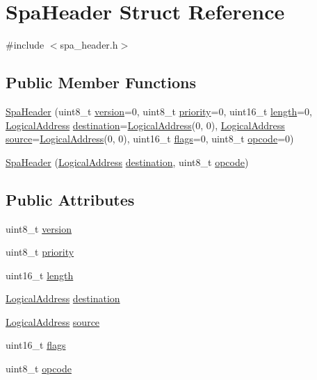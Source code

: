 \hypertarget{structSpaHeader}{}\section{Spa\+Header Struct Reference}
\label{structSpaHeader}


{\ttfamily \#include $<$spa\+\_\+header.\+h$>$}

\subsection*{Public Member Functions}
\begin{DoxyCompactItemize}
\item 
\hyperlink{structSpaHeader_ae285cc7f5785c5d5940ae05a4e93a4f9}{Spa\+Header} (uint8\+\_\+t \hyperlink{structSpaHeader_ad0b9fa178a6b015fdfc312e1bd5fc927}{version}=0, uint8\+\_\+t \hyperlink{structSpaHeader_a3d04bb2382ba9e4a61a05b0f97779d7c}{priority}=0, uint16\+\_\+t \hyperlink{structSpaHeader_a3e5638afb3bf73d772b912d17b68da04}{length}=0, \hyperlink{structLogicalAddress}{Logical\+Address} \hyperlink{structSpaHeader_a0e1de2c2d1f0a5d757ca558801c46ff6}{destination}=\hyperlink{structLogicalAddress}{Logical\+Address}(0, 0), \hyperlink{structLogicalAddress}{Logical\+Address} \hyperlink{structSpaHeader_ad30add6637ff3a67a3043861c7cee511}{source}=\hyperlink{structLogicalAddress}{Logical\+Address}(0, 0), uint16\+\_\+t \hyperlink{structSpaHeader_af39e8bfb4d14dd363f6e86f5a794ae2b}{flags}=0, uint8\+\_\+t \hyperlink{structSpaHeader_abadd112ec54980ec8810eaefe4ba9eec}{opcode}=0)
\item 
\hyperlink{structSpaHeader_a478d40ca88735ff0de2ea92fa2be14f8}{Spa\+Header} (\hyperlink{structLogicalAddress}{Logical\+Address} \hyperlink{structSpaHeader_a0e1de2c2d1f0a5d757ca558801c46ff6}{destination}, uint8\+\_\+t \hyperlink{structSpaHeader_abadd112ec54980ec8810eaefe4ba9eec}{opcode})
\end{DoxyCompactItemize}
\subsection*{Public Attributes}
\begin{DoxyCompactItemize}
\item 
uint8\+\_\+t \hyperlink{structSpaHeader_ad0b9fa178a6b015fdfc312e1bd5fc927}{version}
\item 
uint8\+\_\+t \hyperlink{structSpaHeader_a3d04bb2382ba9e4a61a05b0f97779d7c}{priority}
\item 
uint16\+\_\+t \hyperlink{structSpaHeader_a3e5638afb3bf73d772b912d17b68da04}{length}
\item 
\hyperlink{structLogicalAddress}{Logical\+Address} \hyperlink{structSpaHeader_a0e1de2c2d1f0a5d757ca558801c46ff6}{destination}
\item 
\hyperlink{structLogicalAddress}{Logical\+Address} \hyperlink{structSpaHeader_ad30add6637ff3a67a3043861c7cee511}{source}
\item 
uint16\+\_\+t \hyperlink{structSpaHeader_af39e8bfb4d14dd363f6e86f5a794ae2b}{flags}
\item 
uint8\+\_\+t \hyperlink{structSpaHeader_abadd112ec54980ec8810eaefe4ba9eec}{opcode}
\end{DoxyCompactItemize}



